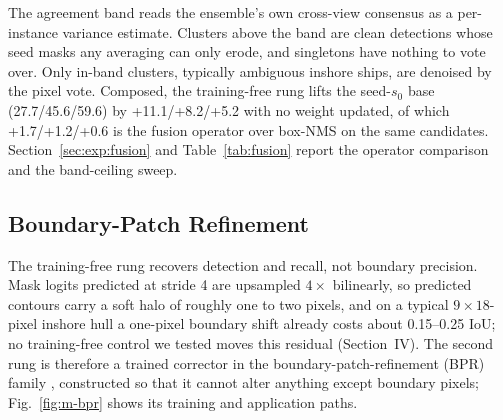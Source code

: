 The agreement band reads the ensemble's own cross-view consensus as a per-instance variance estimate. Clusters above the band are clean detections whose seed masks any averaging can only erode, and singletons have nothing to vote over. Only in-band clusters, typically ambiguous inshore ships, are denoised by the pixel vote. Composed, the training-free rung lifts the seed-$s_0$ base (27.7/45.6/59.6) by +11.1/+8.2/+5.2 with no weight updated, of which +1.7/+1.2/+0.6 is the fusion operator over box-NMS on the same candidates. Section~\ref{sec:exp:fusion} and Table~\ref{tab:fusion} report the operator comparison and the band-ceiling sweep.

\subsection{Boundary-Patch Refinement}\label{sec:bpr}

The training-free rung recovers detection and recall, not boundary precision. Mask logits predicted at stride 4 are upsampled $4\times$ bilinearly, so predicted contours carry a soft halo of roughly one to two pixels, and on a typical $9\times 18$-pixel inshore hull a one-pixel boundary shift already costs about 0.15--0.25 IoU; no training-free control we tested moves this residual (Section~IV). The second rung is therefore a trained corrector in the boundary-patch-refinement (BPR) family \cite{bpr2021}, constructed so that it cannot alter anything except boundary pixels; Fig.~\ref{fig:m-bpr} shows its training and application paths.

